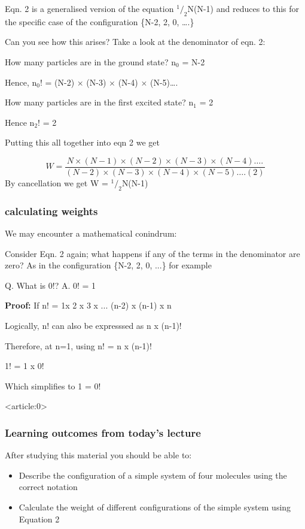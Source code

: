 \documentclass[ignorenonframetext]{beamer}
\begin{document}
\begin{frame}[allowframebreaks]
Eqn. 2 is a generalised version of the equation \(^1/_2\)N(N-1) and reduces to this for the specific case of the configuration 
\{N-2, 2, 0, ….\}\par\medskip
 
Can you see how this arises?\newline
Take a look at the denominator of eqn. 2:\par\medskip
 
How many particles are in the ground state?  n\(_0\) = N-2\par\smallskip
Hence,  n\(_0\)!  = (N-2) \(\times\) (N-3) \(\times\) (N-4) \(\times\) (N-5)….\par\medskip
 
How many particles are in the first excited state? n\(_1\) = 2\par\medskip
 
Hence n\(_2\)!  = 2\par\medskip
 
Putting this all together into eqn 2 we get \par\medskip
 
\[W = \frac{N\times(N-1)\times(N-2)\times(N-3)\times(N-4)….}{(N-2)\times(N-3)\times(N-4)\times(N-5)…. (2)}\]
\medskip
By cancellation we get \quad W = \(^1/_2\)N(N-1)
\end{frame}

\begin{frame}[allowframebreaks]
\frametitle{calculating weights}
We may encounter a mathematical conindrum:  

Consider Eqn. 2 again; what happens if any of the terms in the denominator are zero? As in the configuration \{N-2, 2, 0, ...\} for example  

Q. What is 0!?\newline
A. 0! = 1

\textbf{Proof:}\newline
If n! = 1x 2 x 3 x ... (n-2) x (n-1) x n  

Logically, n! can also be expresssed as n x (n-1)!  

Therefore, at n=1, using n! = n x (n-1)!  

1! = 1 x 0!

Which simplifies to 1 = 0!
\end{frame}


\begin{frame}<article:0>
\frametitle{Learning outcomes from today's lecture}
After studying this material you should be able to:
\begin{itemize}
\item Describe the configuration of a simple system of four molecules using the correct notation
\item Calculate the weight of different configurations of the simple system using Equation 2
\end{itemize}
\end{frame}
\end{document}
